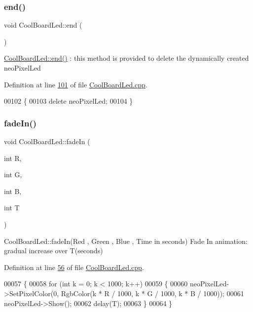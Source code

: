 \subsubsection{\texorpdfstring{end()}{end()}}
{\footnotesize\ttfamily void Cool\+Board\+Led\+::end (\begin{DoxyParamCaption}{ }\end{DoxyParamCaption})}

\hyperlink{class_cool_board_led_a69f323359e0c9f797422f2152b5d41ef}{Cool\+Board\+Led\+::end()} \+: this method is provided to delete the dynamically created neo\+Pixel\+Led 

Definition at line \hyperlink{_cool_board_led_8cpp_source_l00101}{101} of file \hyperlink{_cool_board_led_8cpp_source}{Cool\+Board\+Led.\+cpp}.


\begin{DoxyCode}
00102 \{
00103     \textcolor{keyword}{delete} neoPixelLed;
00104 \}
\end{DoxyCode}
\mbox{\label{class_cool_board_led_aec915442a8441c7cd45c3279d3ff8821}} 
\subsubsection{\texorpdfstring{fade\+In()}{fadeIn()}}
{\footnotesize\ttfamily void Cool\+Board\+Led\+::fade\+In (\begin{DoxyParamCaption}\item[{int}]{R,  }\item[{int}]{G,  }\item[{int}]{B,  }\item[{int}]{T }\end{DoxyParamCaption})}

Cool\+Board\+Led\+::fade\+In(\+Red , Green , Blue , Time in seconds) Fade In animation\+: gradual increase over T(seconds) 

Definition at line \hyperlink{_cool_board_led_8cpp_source_l00056}{56} of file \hyperlink{_cool_board_led_8cpp_source}{Cool\+Board\+Led.\+cpp}.


\begin{DoxyCode}
00057 \{
00058     \textcolor{keywordflow}{for} (\textcolor{keywordtype}{int} k = 0; k < 1000; k++) 
00059     \{
00060         neoPixelLed->SetPixelColor(0, RgbColor(k * R / 1000, k * G / 1000, k * B / 1000));
00061         neoPixelLed->Show();
00062         delay(T);
00063     \}
00064 \}
\end{DoxyCode}
\mbox{\label{class_cool_board_led_a27c4e14fa2cd3639c0844152cea98887}} 
